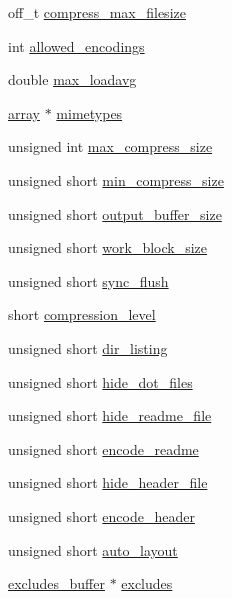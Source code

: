 \begin{DoxyCompactItemize}
off\-\_\-t \hyperlink{structplugin__config_af5ebee1c843bd5f9c79bcda3abe37872}{compress\-\_\-max\-\_\-filesize}
\item 
int \hyperlink{structplugin__config_a7a925bb5a8cf2be24c6f4db3cb3f9006}{allowed\-\_\-encodings}
\item 
double \hyperlink{structplugin__config_a956c2f55ae14bb725e83f3c7733d1444}{max\-\_\-loadavg}
\item 
\hyperlink{structarray}{array} $\ast$ \hyperlink{structplugin__config_a57d3457480703ae7f40e0ada85cf25ef}{mimetypes}
\item 
unsigned int \hyperlink{structplugin__config_af7f726fff8c406a906bb3b52c3daf685}{max\-\_\-compress\-\_\-size}
\item 
unsigned short \hyperlink{structplugin__config_a0b8e331453deca106e79afb2e96e75a1}{min\-\_\-compress\-\_\-size}
\item 
unsigned short \hyperlink{structplugin__config_a746003a87ec7a397f6a12d4d677de0fe}{output\-\_\-buffer\-\_\-size}
\item 
unsigned short \hyperlink{structplugin__config_ae9d80653853b7571ce08b5c358bf8853}{work\-\_\-block\-\_\-size}
\item 
unsigned short \hyperlink{structplugin__config_af474def361a549cc0b8e719d4af2fc68}{sync\-\_\-flush}
\item 
short \hyperlink{structplugin__config_a2600cca34919dfb16950767fa9a2a604}{compression\-\_\-level}
\item 
unsigned short \hyperlink{structplugin__config_a340eeb9fec7e2eedaf7d09372a49aad6}{dir\-\_\-listing}
\item 
unsigned short \hyperlink{structplugin__config_ae22fc24e78563e179fc8f5c5d66908d8}{hide\-\_\-dot\-\_\-files}
\item 
unsigned short \hyperlink{structplugin__config_a7e495d4e5ef0b6cbe7f89c8f0051344a}{hide\-\_\-readme\-\_\-file}
\item 
unsigned short \hyperlink{structplugin__config_a20695d2d3117f105313da889def722ed}{encode\-\_\-readme}
\item 
unsigned short \hyperlink{structplugin__config_a20efae724b908d84708092c243bdbfec}{hide\-\_\-header\-\_\-file}
\item 
unsigned short \hyperlink{structplugin__config_ad8d90f1da64ec97d46612c05cfcc4fb6}{encode\-\_\-header}
\item 
unsigned short \hyperlink{structplugin__config_a7b6c9c6c868b413dfdb80c60b7ccc8af}{auto\-\_\-layout}
\item 
\hyperlink{structexcludes__buffer}{excludes\-\_\-buffer} $\ast$ \hyperlink{structplugin__config_a8d5a7a71f3091b091a37b08f5481b16f}{excludes}

\end{DoxyCompactItemize}
